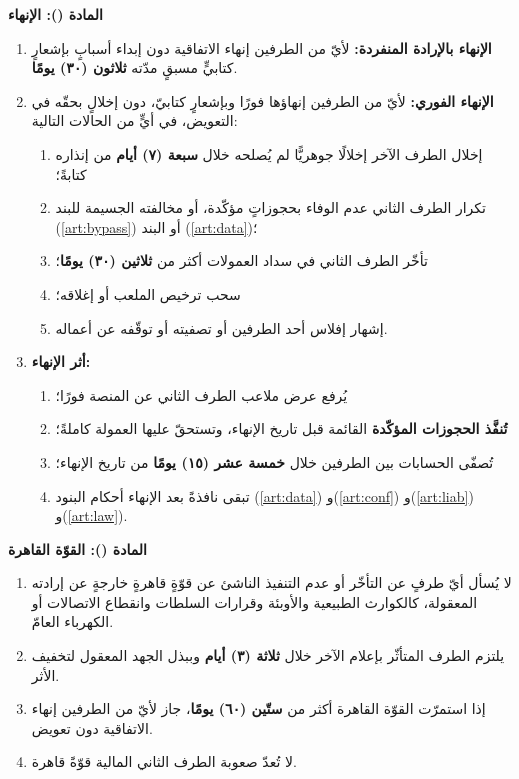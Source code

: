 \documentclass[12pt,a4paper]{article}
\newcounter{bndc}
\newcommand{\bnd}[1]{%
  \vspace{10pt}\par\noindent
  {\color{teal}\bfseries\large المادة (\arabic{bndc}): #1}%
  \stepcounter{bndc}%
  \par\vspace{2pt}\noindent{\color{rule}\rule{\linewidth}{0.6pt}}\par\vspace{4pt}%
}
\newcommand{\mlh}[1]{{\bfseries #1}}
\newenvironment{bnditems}
  {\begin{enumerate}[label=\arabic{bndc}.\arabic*,leftmargin=1.6em,itemsep=3pt,topsep=3pt]}
  {\end{enumerate}}
\newenvironment{sublist}
  {\begin{enumerate}[label=(\alph*),leftmargin=1.6em,itemsep=2pt,topsep=2pt]}
  {\end{enumerate}}
\begin{document}
\bnd{الإنهاء}
\begin{bnditems}
  \item \mlh{الإنهاء بالإرادة المنفردة:} لأيّ من الطرفين إنهاء الاتفاقية دون إبداء أسبابٍ بإشعارٍ كتابيٍّ مسبقٍ مدّته \mlh{ثلاثون (٣٠) يومًا}.
  \item \mlh{الإنهاء الفوري:} لأيّ من الطرفين إنهاؤها فورًا وبإشعارٍ كتابيّ، دون إخلالٍ بحقّه في التعويض، في أيٍّ من الحالات التالية:
  \begin{sublist}
    \item إخلال الطرف الآخر إخلالًا جوهريًّا لم يُصلحه خلال \mlh{سبعة (٧) أيام} من إنذاره كتابةً؛
    \item تكرار الطرف الثاني عدم الوفاء بحجوزاتٍ مؤكّدة، أو مخالفته الجسيمة للبند (\ref{art:bypass}) أو البند (\ref{art:data})؛
    \item تأخّر الطرف الثاني في سداد العمولات أكثر من \mlh{ثلاثين (٣٠) يومًا}؛
    \item سحب ترخيص الملعب أو إغلاقه؛
    \item إشهار إفلاس أحد الطرفين أو تصفيته أو توقّفه عن أعماله.
  \end{sublist}
  \item \mlh{أثر الإنهاء:}
  \begin{sublist}
    \item يُرفع عرض ملاعب الطرف الثاني عن المنصة فورًا؛
    \item \mlh{تُنفَّذ الحجوزات المؤكّدة} القائمة قبل تاريخ الإنهاء، وتستحقّ عليها العمولة كاملةً؛
    \item تُصفّى الحسابات بين الطرفين خلال \mlh{خمسة عشر (١٥) يومًا} من تاريخ الإنهاء؛
    \item تبقى نافذةً بعد الإنهاء أحكام البنود (\ref{art:data}) و(\ref{art:conf}) و(\ref{art:liab}) و(\ref{art:law}).
  \end{sublist}
\end{bnditems}

\bnd{القوّة القاهرة}
\begin{bnditems}
  \item لا يُسأل أيّ طرفٍ عن التأخّر أو عدم التنفيذ الناشئ عن قوّةٍ قاهرةٍ خارجةٍ عن إرادته المعقولة، كالكوارث الطبيعية والأوبئة وقرارات السلطات وانقطاع الاتصالات أو الكهرباء العامّ.
  \item يلتزم الطرف المتأثّر بإعلام الآخر خلال \mlh{ثلاثة (٣) أيام} وببذل الجهد المعقول لتخفيف الأثر.
  \item إذا استمرّت القوّة القاهرة أكثر من \mlh{ستّين (٦٠) يومًا}، جاز لأيّ من الطرفين إنهاء الاتفاقية دون تعويض.
  \item لا تُعدّ صعوبة الطرف الثاني المالية قوّةً قاهرة.
\end{bnditems}
\end{document}
